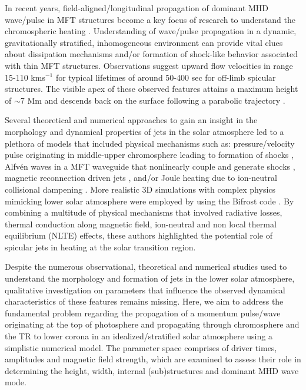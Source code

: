 \documentclass[12pt]{ociamthesis}
\begin{document}
In recent years, field-aligned/longitudinal propagation of dominant MHD wave/pulse in MFT structures become a key focus of research to understand the chromospheric heating \citep{Narain1990, Zaqarashvili_2009SSRv, Jess2015}. Understanding of wave/pulse propagation in a dynamic, gravitationally stratified, inhomogeneous environment can provide vital clues about dissipation mechanisms and/or formation of shock-like behavior associated with thin MFT structures. Observations suggest upward flow velocities in range 15-110 kms$^{-1}$  for typical lifetimes of around 50-400 sec for off-limb spicular structures. The visible apex of these observed features attains a maximum height of $\sim$7 Mm and descends back on the surface following a parabolic trajectory \citep{Pereira2012,Pereira2016ApJ82465P}. 

Several theoretical and numerical approaches to gain an insight in the morphology and dynamical properties of jets in the solar atmosphere led to a plethora of models \citep[early reviews by:][]{Sterling_2000SoPh} that included physical mechanisms such as: pressure/velocity pulse originating in middle-upper chromosphere leading to formation of shocks \citep{Shibata1982, Suematsu1982SoPh7599S, Hollweg1982ApJ257345H, Sterling1990ApJ349647S, Heggland2007ApJ6661277H, kuzma2017ApJ84978K}, Alfv\'en waves in a MFT waveguide that nonlinearly couple and generate shocks \citep{Hollweg1982SoPh7535H, Hollweg1992ApJ389731H, Kudoh1999ApJ514493K, Matsumoto2010ApJ7101857M}, magnetic reconnection driven jets \citep{Yokoyama1995Natur37542Y, Yokoyama1996PASJ48353Y, Archontis2005ApJ6351299A, Isobe2008ApJ679L57I, Nishizuka2008ApJ683L83N, Sterling2010ApJ, Gonz2017ApJ, Gonz2018ApJ856176G}, and/or Joule heating due to ion-neutral collisional dampening \citep{Haerendel1992Natur360241H, James2003AA}. More realistic 3D simulations with complex physics mimicking lower solar atmosphere were employed by \citep{Mart2017Sci3561269M, Mart2018ApJ860116M, Mart2020ApJ88995M} using the Bifrost code \citep{Gudiksen2011AA531A154G}. By combining a multitude of physical mechanisms that involved radiative losses, thermal conduction along magnetic field, ion-neutral and non local thermal equilibrium (NLTE) effects, these authors highlighted the potential role of spicular jets in heating at the solar transition region.

Despite the numerous observational, theoretical and numerical studies used to understand the morphology and formation of jets in the lower solar atmosphere, qualitative investigation on parameters that influence the observed dynamical characteristics of these features remains missing. Here, we aim to address the fundamental problem regarding the propagation of a momentum pulse/wave originating at the top of photosphere and propagating through chromosphere and the TR to lower corona in an idealized/stratified solar atmosphere using a simplistic numerical model. The parameter space comprises of driver times, amplitudes and magnetic field strength, which are examined to assess their role in determining the height, width, internal (sub)structures and dominant MHD wave mode.
\end{document}
